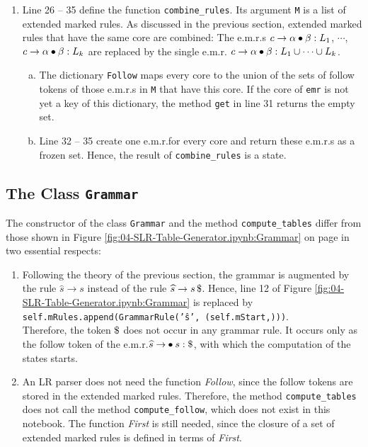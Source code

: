 \begin{enumerate}
      \ref{fig:04-SLR-Table-Generator.ipynb:MarkedRule}, but without any further methods, since marked rules are only
      needed as cores.
\item Line 26 -- 35 define the function \texttt{combine\_rules}.  Its argument \texttt{M} is a list of extended
      marked rules.  As discussed in the previous section, extended marked rules that have the same core are
      combined:  The e.m.r.s $c \rightarrow \alpha \mdot \beta: L_1$, $\cdots$,
      $c \rightarrow \alpha \mdot \beta: L_k$ are replaced by the single e.m.r.\@
      $c \rightarrow \alpha \mdot \beta: L_1 \cup \cdots \cup L_k$.
      \begin{enumerate}[(a)]
      \item The dictionary \texttt{Follow} maps every core to the union of the sets of follow tokens of those
            e.m.r.s in \texttt{M} that have this core.  If the core of \texttt{emr} is not yet a key of this
            dictionary, the method \texttt{get} in line 31 returns the empty set.
      \item Line 32 -- 35 create one e.m.r.\@ for every core and return these e.m.r.s as a frozen set.  Hence, the
            result of \texttt{combine\_rules} is a state.
      \end{enumerate}
\end{enumerate}

\subsection{The Class \texttt{Grammar}}
The constructor of the class \texttt{Grammar} and the method \texttt{compute\_tables} differ from those shown in
Figure \ref{fig:04-SLR-Table-Generator.ipynb:Grammar} on page \pageref{fig:04-SLR-Table-Generator.ipynb:Grammar} in two
essential respects:
\begin{enumerate}
\item Following the theory of the previous section, the grammar is augmented by the rule
      $\widehat{s} \rightarrow s$ instead of the rule $\widehat{s} \rightarrow s\, \symbol{36}$.  Hence, line 12 of
      Figure \ref{fig:04-SLR-Table-Generator.ipynb:Grammar} is replaced by
      \\[0.2cm]
      \hspace*{1.3cm}
      \texttt{self.mRules.append(GrammarRule('ŝ', (self.mStart,)))}.
      \\[0.2cm]
      Therefore, the token $\symbol{36}$ does not occur in any grammar rule.  It occurs only as the follow token of
      the e.m.r.\@ $\widehat{s} \rightarrow \mdot s: \symbol{36}$, with which the computation of the states
      starts.
\item An LR parser does not need the function \textsl{Follow}, since the follow tokens are stored in the extended
      marked rules.  Therefore, the method \texttt{compute\_tables} does not call the method
      \texttt{compute\_follow}, which does not exist in this notebook.  The
      function \textsl{First} is still needed, since the closure of a set of extended marked rules is defined in
      terms of \textsl{First}.
\end{enumerate}

